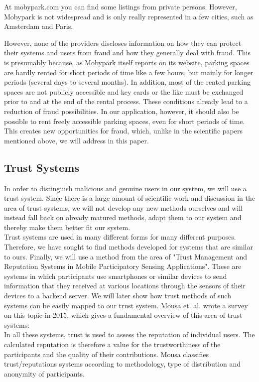 \documentclass[
a4paper,     %
titlepage,   %
14pt         %
]{scrartcl}  %
\theoremstyle{mystyle}
\begin{document}
At mobypark.com you can find some listings from private persons. However, Mobypark is not widespread and is only really represented in a few cities, such as Amsterdam and Paris.

However, none of the providers discloses information on how they can protect their systems and users from fraud and how they generally deal with fraud. This is presumably because, as Mobypark itself reports on its website, parking spaces are hardly rented for short periods of time like a few hours, but mainly for longer periods (several days to several months). In addition, most of the rented parking spaces are not publicly accessible and key cards or the like must be exchanged prior to and at the end of the rental process. These conditions already lead to a reduction of fraud possibilities. In our application, however, it should also be possible to rent freely accessible parking spaces, even for short periods of time. This creates new opportunities for fraud, which, unlike in the scientific papers mentioned above, we will address in this paper.

\subsection{Trust Systems}
In order to distinguish malicious and genuine users in our system, we will use a trust system. Since there is a large amount of scientific work and discussion in the area of trust systems, we will not develop any new methods ourselves and will instead fall back on already matured methods, adapt them to our system and thereby make them better fit our system.\\

Trust systems are used in many different forms for many different purposes. Therefore, we have sought to find methods developed for systems that are similar to ours. Finally, we will use a method from the area of "Trust Management and Reputation Systems in Mobile Participatory Sensing Applications". These are systems in which participants use smartphones or similar devices to send information that they received at various locations through the sensors of their devices to a backend server. We will later show how trust methods of such systems can be easily mapped to our trust system. Mousa et. al. wrote a survey on this topic in 2015, which gives a fundamental overview of this area of trust systems\cite{mousa2015trust}:\\

In all these systems, trust is used to assess the reputation of individual users. The calculated reputation is therefore a value for the trustworthiness of the participants and the quality of their contributions. Mousa classifies trust/reputations systems according to methodology, type of distribution and anonymity of participants. 
\end{document}
